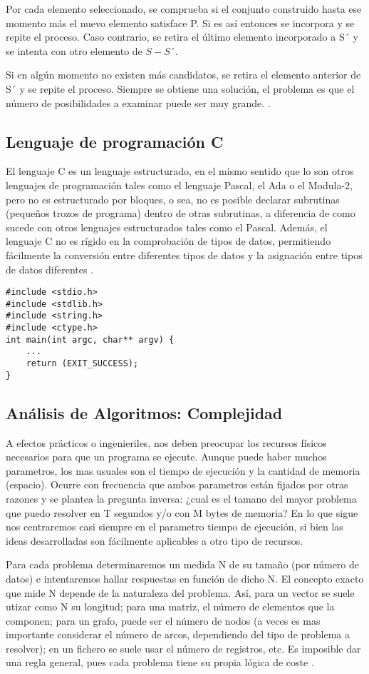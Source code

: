 \documentclass[9pt,twocolumn,twoside]{optica}
\begin{document}
Por cada elemento seleccionado, se comprueba si el conjunto construido hasta ese momento más el nuevo elemento satisface P. Si es así entonces se incorpora y se repite el proceso. Caso contrario, se retira el último elemento incorporado a S´ y se intenta con otro elemento de $ S-S´$.

Si en algún momento no existen más candidatos, se retira el elemento anterior de S´ y se repite el proceso. Siempre se obtiene una solución, el problema es que el número de posibilidades a examinar puede ser muy grande. 
 \cite{algoritmo}.

\subsection{Lenguaje de programación C}
El lenguaje C es un lenguaje estructurado, en el mismo sentido que lo son otros
lenguajes de programación tales como el lenguaje Pascal, el Ada o el Modula-2, pero
no es estructurado por bloques, o sea, no es posible declarar subrutinas (pequeños
trozos de programa) dentro de otras subrutinas, a diferencia de como sucede con otros lenguajes estructurados tales como el Pascal. Además, el lenguaje C no es rígido en la comprobación de tipos de datos, permitiendo fácilmente la conversión entre diferentes tipos de datos y la asignación entre tipos de datos diferentes \cite{lenguajeC}.
\lstset{language=C, breaklines=true, basicstyle=\footnotesize}
\begin{lstlisting}[frame=single]
#include <stdio.h>
#include <stdlib.h>
#include <string.h>
#include <ctype.h>
int main(int argc, char** argv) {
    ...
    return (EXIT_SUCCESS); 
}
\end{lstlisting}
\subsection{Análisis de Algoritmos: Complejidad}
 A efectos prácticos o ingenieriles, nos deben preocupar los recursos físicos necesarios para que un programa se ejecute. Aunque puede haber muchos parametros, los mas usuales son el tiempo de ejecución y la cantidad de memoria (espacio). Ocurre con frecuencia que ambos parametros están fijados por otras razones y se plantea la pregunta inversa: ¿cual es el tamano del mayor problema que puedo resolver en T segundos y/o con M bytes de memoria? En lo que sigue nos centraremos casi siempre en el parametro tiempo de ejecución, si bien las ideas desarrolladas son fácilmente aplicables a otro tipo de recursos.

Para cada problema determinaremos un medida N de su tamaño (por número de datos) e intentaremos hallar respuestas en función de dicho N. El concepto exacto que mide N depende de la naturaleza del problema. Así, para un vector se suele utizar como N su longitud; para una matriz, el número de elementos que la componen; para un grafo, puede ser el número de nodos (a veces es mas importante considerar el número de arcos, dependiendo del tipo de problema a resolver); en un fichero se suele usar el número de registros, etc. Es imposible dar una regla general, pues cada problema tiene su propia lógica de coste  \cite{complejidad}.
\end{document}
